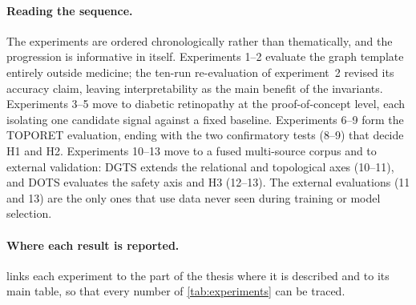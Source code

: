 \paragraph{Reading the sequence.}
The experiments are ordered chronologically rather than thematically, and the progression
is informative in itself. Experiments 1--2 evaluate the graph template entirely outside
medicine; the ten-run re-evaluation of experiment~2 revised its accuracy claim, leaving
interpretability as the main benefit of the invariants. Experiments 3--5 move to diabetic retinopathy at the proof-of-concept level,
each isolating one candidate signal against a fixed baseline. Experiments 6--9 form the
TOPORET evaluation, ending with the two confirmatory tests (8--9) that decide H1 and H2.
Experiments 10--13 move to a fused multi-source corpus and to external validation: DGTS
extends the relational and topological axes (10--11), and DOTS evaluates the safety axis
and H3 (12--13). The external evaluations (11 and 13) are the only ones that use data never
seen during training or model selection.


\paragraph{Where each result is reported.}
 links each experiment to the part of the thesis where it is described
and to its main table, so that every number of \cref{tab:experiments} can be traced.

